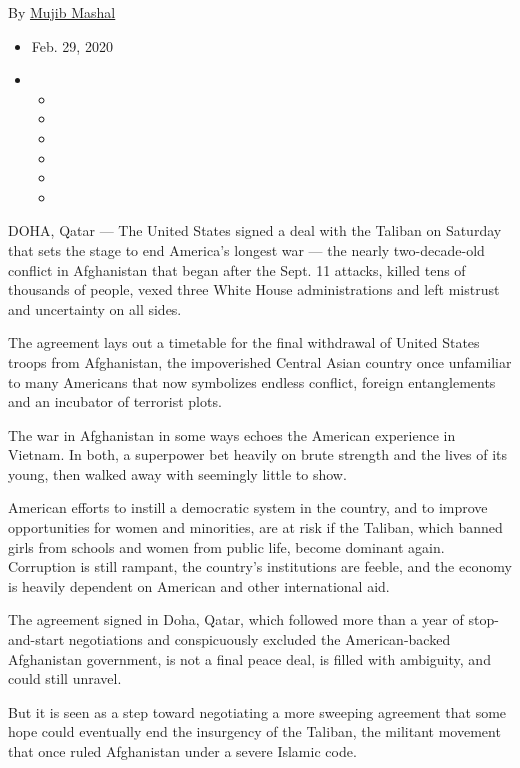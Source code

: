 By \href{https://www.nytimes.com/by/mujib-mashal}{Mujib Mashal}

\begin{itemize}
\item
  Feb. 29, 2020
\item
  \begin{itemize}
  \item
  \item
  \item
  \item
  \item
  \item
  \end{itemize}
\end{itemize}

DOHA, Qatar --- The United States signed a deal with the Taliban on
Saturday that sets the stage to end America's longest war --- the nearly
two-decade-old conflict in Afghanistan that began after the Sept. 11
attacks, killed tens of thousands of people, vexed three White House
administrations and left mistrust and uncertainty on all sides.

The agreement lays out a timetable for the final withdrawal of United
States troops from Afghanistan, the impoverished Central Asian country
once unfamiliar to many Americans that now symbolizes endless conflict,
foreign entanglements and an incubator of terrorist plots.

The war in Afghanistan in some ways echoes the American experience in
Vietnam. In both, a superpower bet heavily on brute strength and the
lives of its young, then walked away with seemingly little to show.

American efforts to instill a democratic system in the country, and to
improve opportunities for women and minorities, are at risk if the
Taliban, which banned girls from schools and women from public life,
become dominant again. Corruption is still rampant, the country's
institutions are feeble, and the economy is heavily dependent on
American and other international aid.

The agreement signed in Doha, Qatar, which followed more than a year of
stop-and-start negotiations and conspicuously excluded the
American-backed Afghanistan government, is not a final peace deal, is
filled with ambiguity, and could still unravel.

But it is seen as a step toward negotiating a more sweeping agreement
that some hope could eventually end the insurgency of the Taliban, the
militant movement that once ruled Afghanistan under a severe Islamic
code.

